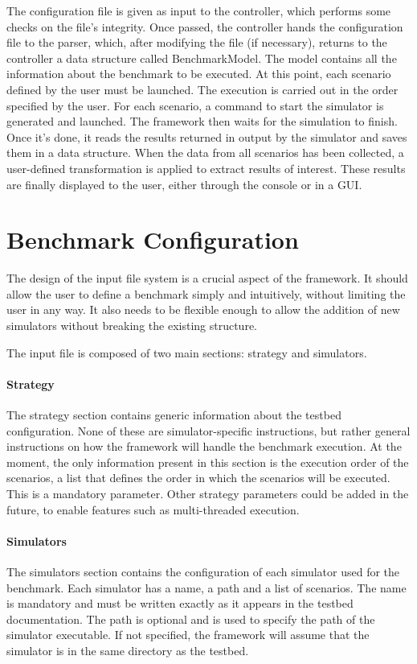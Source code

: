 \documentclass[12pt,a4paper,openright,twoside]{book}
\begin{document}
The configuration file is given as input to the controller, which performs some checks on the file's integrity.
Once passed, the controller hands the configuration file to the parser, which, after modifying the file (if necessary), returns to the controller a data structure called BenchmarkModel.
The model contains all the information about the benchmark to be executed.
At this point, each scenario defined by the user must be launched.
The execution is carried out in the order specified by the user.
For each scenario, a command to start the simulator is generated and launched.
The framework then waits for the simulation to finish.
Once it's done, it reads the results returned in output by the simulator and saves them in a data structure.
When the data from all scenarios has been collected, a user-defined transformation is applied to extract results of interest.
These results are finally displayed to the user, either through the console or in a GUI.

\section{Benchmark Configuration}

The design of the input file system is a crucial aspect of the framework.
It should allow the user to define a benchmark simply and intuitively, without limiting the user in any way.
It also needs to be flexible enough to allow the addition of new simulators without breaking the existing structure.

The input file is composed of two main sections: strategy and simulators.

\paragraph*{Strategy}
The strategy section contains generic information about the testbed configuration.
None of these are simulator-specific instructions, but rather general instructions on how the framework will handle the benchmark execution.
At the moment, the only information present in this section is the execution order of the scenarios,
a list that defines the order in which the scenarios will be executed. This is a mandatory parameter.
Other strategy parameters could be added in the future, to enable features such as multi-threaded execution.

\paragraph*{Simulators}
The simulators section contains the configuration of each simulator used for the benchmark.
Each simulator has a name, a path and a list of scenarios.
The name is mandatory and must be written exactly as it appears in the testbed documentation.
The path is optional and is used to specify the path of the simulator executable.
If not specified, the framework will assume that the simulator is in the same directory as the testbed.
\end{document}
